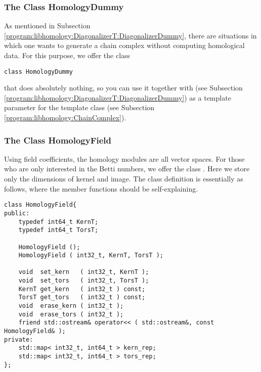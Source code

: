 \subsubsection{The Class HomologyDummy}
\label{program:libhomology:HomologyT:HomologyDummy}
As mentioned in Subsection \ref{program:libhomology:DiagonalizerT:DiagonalizerDummy}, there are situations in which one wants to generate a chain complex without computing homological data.
For this purpose, we offer the class
\begin{lstlisting}
class HomologyDummy
\end{lstlisting}
that does absolutely nothing, so you can use it together with  (see Subsection \ref{program:libhomology:DiagonalizerT:DiagonalizerDummy})
as a template parameter for the template class  (see Subsection \ref{program:libhomology:ChainComplex}).

\subsubsection{The Class HomologyField}
Using field coefficients, the homology modules are all vector spaces.
For those who are only interested in the Betti numbers, we offer the class .
Here we store only the dimensions of kernel and image.
The class definition is essentially as follows, where the member functions should be self-explaining.
\begin{lstlisting}
class HomologyField{
public:
    typedef int64_t KernT;
    typedef int64_t TorsT;
    
    HomologyField ();
    HomologyField ( int32_t, KernT, TorsT );
    
    void  set_kern   ( int32_t, KernT );
    void  set_tors   ( int32_t, TorsT );
    KernT get_kern   ( int32_t ) const;
    TorsT get_tors   ( int32_t ) const;
    void  erase_kern ( int32_t );
    void  erase_tors ( int32_t );
    friend std::ostream& operator<< ( std::ostream&, const HomologyField& );
private:
    std::map< int32_t, int64_t > kern_rep;
    std::map< int32_t, int64_t > tors_rep;
};
\end{lstlisting}

